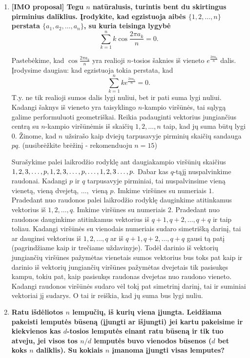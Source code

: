 \begin{enumerate}
\medskip

\item {\bf [IMO proposal] Tegu $n$ natūralusis, turintis bent du skirtingus pirminius daliklius. Įrodykite, kad egzistuoja aibės $\{1,2,\dots,n\}$ perstata $\{a_1,a_2,\dots,a_n\}$, su kuria teisinga lygybė 
$$\sum_{k=1}^nk\cos{\frac{2\pi a_k}{n}}=0.$$}

\medskip

Pastebėkime, kad $\cos{\frac{2\pi a_k}{n}}$ yra realioji $n$-tosios šaknies iš vieneto $e^{\frac{2\pi a_k}{n}}$ dalis. Įrodysime daugiau: kad egzistuoja tokia perstata, kad $$\sum_{k=1}^nke^{\frac{2\pi a_k}{n}}=0.$$ 
T.y. ne tik realioji sumos dalis lygi nuliui, bet ir pati suma lygi nuliui.
Kadangi šaknys iš vieneto yra taisyklingo $n$-kampio viršūnės, tai sąlygą galime performuluoti geometriškai. Reikia padauginti vektorius jungiančius centrą su $n$-kampio viršūnėmis iš skaičių $1,2,\dots,n$ taip, kad jų suma būtų lygi $0$.
Žinome, kad $n$ užsirašo kaip dviejų tarpusavyje pirminių skaičių sandauga $pq$. 
(nusibrėžkite brėžinį - rekomenduoju $n=15$)

\medskip

Surašykime palei laikrodžio rodyklę ant daugiakampio viršūnių skaičius $1, 2, 3, \dots, p, \\1, 2, 3, \dots, p, \dots, 1, 2, 3\dots, p.$ Dabar kas $q$-tąjį nuspalvinkime raudonai. Kadangi $p$ ir $q$ tarpusavyje pirminiai, tai nuspalvinsime vieną vienetą, vieną dvejetą, $\dots,$ vieną $p$. Imkime viršūnes su numeriais $1$. Pradedant nuo raudonos palei laikrodžio rodyklę dauginkime atitinkamus vektorius iš $1, 2, \dots,q$. Imkime viršūnes su numeriais $2$. Pradedant nuo raudonos dauginkime atitinkamus vektorius iš $q+1, q+2,\dots,q+q$ ir taip toliau. Kadangi viršūnės su vienodais numeriais sudaro simetrišką darinį, tai ar dauginsi vektorius iš $1, 2, \dots,q$ ar iš $q+1, q+2,\dots,q+q$ gausi tą patį (pagrindžiame kaip ir trečiame uždavinyje). Todėl darinio iš vektorių jungiančių viršūnes pažymėtas vienetais sumos vektorius bus toks pat kaip ir darinio iš vektorių jungiančių viršūnes pažymėtas dvejetais tik pasisukęs kampu, tokiu pat, kaip pasisukęs raudonas dvejetas nuo raudono vieneto. Kadangi raudonos viršūnės sudaro vėl tokį pat simetrinį darinį, tai ir suminiai vektoriai jį sudarys. O tai ir reiškia, kad jų suma bus lygi nuliu.

\medskip

\item {\bf Ratu išdėliotos $n$ lempučių, iš kurių viena įjungta. Leidžiama pakeisti lemputės būseną (įjungti ar išjungti) jei kartu pakeisime ir kiekvienos kas $d$-tosios lemputės einant ratu būseną ir tik tuo atveju, jei visos tos $n/d$ lemputės buvo vienodos būsenos ($d$ bet koks $n$ daliklis). Su kokiais $n$ įmanoma įjungti visas lemputes?} 


\end{enumerate}
